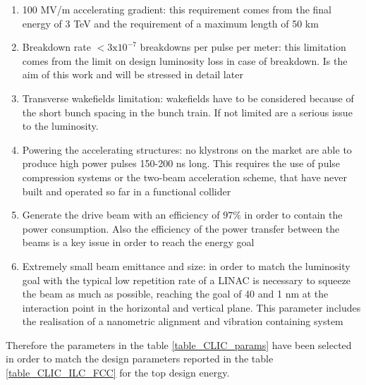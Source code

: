 \begin{enumerate}
\item 100 MV/m accelerating gradient: this requirement comes from the final energy of 3 TeV and the requirement of a maximum length of 50 km
\item Breakdown rate $< 3\text{x}10^{-7}$ breakdowns per pulse per meter: this limitation comes from the limit on design luminosity loss in case of breakdown. Is the aim of this work and will be stressed in detail later
\item Transverse wakefields limitation: wakefields have to be considered because of the short bunch spacing in the bunch train. If not limited are a serious issue to the luminosity.
\item Powering the accelerating structures: no klystrons on the market are able to produce high power pulses 150-200 ns long. This requires the use of pulse compression systems or the two-beam acceleration scheme, that have never built and operated so far in a functional collider
\item Generate the drive beam with an efficiency of $97 \%$ in order to contain the power consumption. Also the efficiency of the power transfer between the beams is a key issue in order to reach the energy goal
\item Extremely small beam emittance and size: in order to match the luminosity goal with the typical low repetition rate of a LINAC is necessary to squeeze the beam as much as possible, reaching the goal of 40 and 1 nm at the interaction point in the horizontal and vertical plane. This parameter includes the realisation of a nanometric alignment and vibration containing system 
\end{enumerate}





Therefore the parameters in the table \ref{table_CLIC_params} have been selected in order to match the design parameters reported in the table \ref{table_CLIC_ILC_FCC} for the top design energy.


